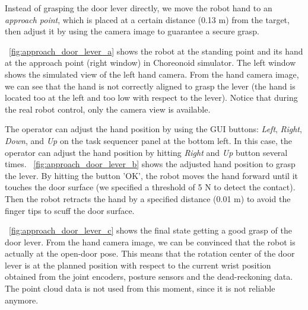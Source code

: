 Instead of grasping the door lever directly, we move the robot hand to an {\it approach point},
which is placed at a certain distance (0.13 m) from the target, then adjust it
by using the camera image to guarantee a secure grasp.




\figurename~\ref{fig:approach_door_lever_a} shows the robot at the standing point and its hand at the
approach point (right window) in Choreonoid simulator.
The left window shows the simulated view of the left hand camera.
From the hand camera image, we can see that the hand is not correctly aligned 
to grasp the lever (the hand is located too at the left and too low with respect to the lever). 
Notice that during the real robot control, only the camera view is available. 

The operator can adjust the hand position by using the GUI buttons: 
{\it Left}, {\it Right}, {\it Down}, and {\it Up} on the task sequencer panel at the bottom left.
In this case, the operator can adjust the hand position by hitting {\it Right} and {\it Up} button
several times.
\figurename~\ref{fig:approach_door_lever_b} shows the adjusted hand position to grasp the lever.
By hitting the button 'OK', the robot moves the hand forward until it touches the door surface
(we specified a threshold of 5 N to detect the contact).
Then the robot retracts the hand by a specified distance (0.01 m) to avoid the finger tips to scuff
the door surface.

\figurename~\ref{fig:approach_door_lever_c} shows the final state getting a good grasp of the door lever.
From the hand camera image, we can be convinced that the robot is actually at the open-door pose.
This means that the rotation center of the door lever is at the planned position with respect to the 
current wrist position obtained from the joint encoders, posture sensors and the dead-reckoning data.
The point cloud data is not used from this moment, since it is not reliable anymore.

